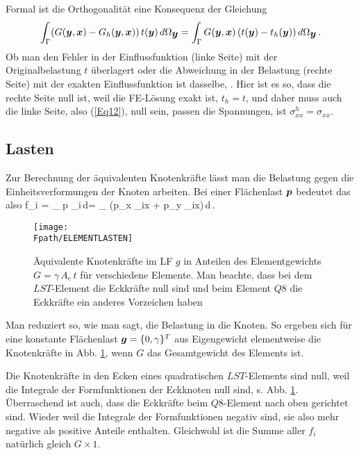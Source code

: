 {Formal ist die Orthogonalit\"{a}t eine Konsequenz der Gleichung
\begin{align}
\int_{\Gamma} (G(\mbox{\boldmath $y$},\mbox{\boldmath $x$}) - G_h(\mbox{\boldmath $y$},\mbox{\boldmath $x$}))\,t(\mbox{\boldmath $y$})\,d\Omega_{\mbox{\boldmath $y$}} = \int_{\Gamma} G(\mbox{\boldmath $y$},\mbox{\boldmath $x$})\,(t(\mbox{\boldmath $y$}) - t_h(\mbox{\boldmath $y$}))\,d\Omega_{\mbox{\boldmath $y$}}\,.
\end{align}
Ob man den Fehler in der Einflussfunktion (linke Seite) mit der Originalbelastung $t$ \"{u}berlagert oder die Abweichung in der Belastung (rechte Seite) mit der exakten Einflussfunktion ist dasselbe, \cite{HaJa2}. Hier ist es so, dass die rechte Seite null ist, weil die FE-L\"{o}sung exakt ist, $t_h = t$, und daher muss auch die linke Seite, also (\ref{Eq12}), null sein, passen die Spannungen, ist $\sigma_{xx}^h = \sigma_{xx}$.

{\textcolor{sectionTitleBlue}{\section{Lasten}}}
Zur Berechnung der \"{a}quivalenten Knotenkr\"{a}fte l\"{a}sst man die Belastung gegen die
Einheitsverformungen der Knoten arbeiten. Bei einer Fl\"{a}chenlast $\mbox{\boldmath $p$}$
bedeutet das also
\bfo
f_i = \int_{\Omega} \vek p \dotprod \vek \Np_i\,d\Omega = \int_{\Omega} (p_x \cdot \Np_{ix} + p_y \cdot  \Np_{ix})\,d\Omega\,.
\efo
\begin{figure}[tbp] \centering
\if {} \sidecaption \fi
\texttt{[image: \\Fpath/ELEMENTLASTEN]}
\caption{\"{A}quivalente Knotenkr\"{a}fte im LF $g$ in Anteilen des Elementgewichts $G =
\gamma\,A_e\,t$ f\"{u}r verschiedene Elemente. Man beachte, dass bei dem $LST$-Element die
Eckkr\"{a}fte null sind und beim Element $Q8$ die Eckkr\"{a}fte ein anderes Vorzeichen haben}
\label{Elementlasten}
\end{figure}%
Man reduziert so, wie man sagt, die Belastung in die Knoten. So ergeben sich f\"{u}r eine konstante Fl\"{a}chenlast $\mbox{\boldmath $g$} = \{0,\gamma \}^T$ aus Eigengewicht elementweise die Knotenkr\"{a}fte in Abb. \ref{Elementlasten}, wenn $G$ das
Gesamtgewicht des Elements ist.

Die Knotenkr\"{a}fte in den Ecken eines quadratischen $LST$-Elements sind null, weil die Integrale der Formfunktionen der Eckknoten null sind, s. Abb. \ref{Elementlasten}. \"{U}berraschend ist auch, dass die Eckkr\"{a}fte beim $Q8$-Element nach oben gerichtet sind. Wieder weil die Integrale der Formfunktionen negativ sind, sie also mehr negative als positive Anteile enthalten. Gleichwohl ist die Summe aller $f_i$ nat\"{u}rlich gleich $G \times  1$.

}
